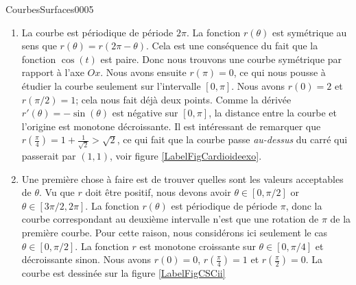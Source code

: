 \begin{corrige}{CourbesSurfaces0005}

	\begin{enumerate}
		\item
			\newcommand{\CaptionFigCardioideexo}{La cardioïde de l'exercice \ref{exoCourbesSurfaces0005}.\ref{CSCi}.}
			
                        La courbe est périodique de période $2\pi$. La fonction $r(\theta)$ est symétrique au sens que $r(\theta)=r(2\pi-\theta)$. Cela est une conséquence du fait que la fonction $\cos(t)$ est paire. Donc nous trouvons une courbe symétrique par rapport à l'axe $Ox$. Nous avons ensuite $r(\pi)=0$, ce qui nous pousse à étudier la courbe seulement sur l'intervalle $[0,\pi]$.
			Nous avons $r(0)=2$ et $r(\pi/2)=1$; cela nous fait déjà deux points. Comme la dérivée $r'(\theta)=-\sin(\theta)$ est négative sur $[0,\pi]$, la distance entre la courbe et l'origine est monotone décroissante. Il est intéressant de remarquer que $r(\frac{ \pi }{ 4 })=1+\frac{1}{ \sqrt{2} }>\sqrt{2}$, ce qui fait que la courbe passe \emph{au-dessus} du carré qui passerait par $(1,1)$, voir figure \ref{LabelFigCardioideexo}.

		\item
			Une première chose à faire est de trouver quelles sont les valeurs acceptables de $\theta$. Vu que $r$ doit être positif, nous devons avoir $\theta\in[0,\pi/2]$ or $\theta\in[3\pi/2,2\pi]$. La fonction $r(\theta)$ est périodique de période $\pi$, donc la courbe correspondant au deuxième intervalle n'est que une rotation de $\pi$ de la première courbe. Pour cette raison, nous considérons ici seulement le cas $\theta\in[0,\pi/2]$. La fonction $r$ est monotone croissante sur $\theta\in[0,\pi/4]$ et décroissante sinon. Nous avons $r(0)=0$, $r(\frac{ \pi }{ 4 })=1$ et $r(\frac{ \pi }{2})=0$. La courbe est dessinée sur la figure \ref{LabelFigCSCii}

			\newcommand{\CaptionFigCSCii}{La courbe de l'exercice \ref{exoCourbesSurfaces0005}.\ref{CSCii}.}
			


\end{enumerate}
\end{corrige}
